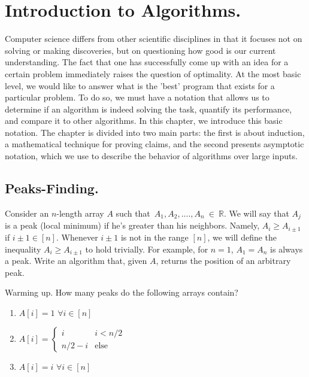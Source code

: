 
\newcommand*{\RECITATION}{}%
\newcommand*{\BOOK}{}%


\chapter{Introduction to Algorithms.}
\ifdefined\RECITATION
\else
Computer science differs from other scientific disciplines in that it focuses not on solving or making discoveries, but on questioning how good is our current understanding. The fact that one has successfully come up with an idea for a certain problem immediately raises the question of optimality. At the most basic level, we would like to answer what is the 'best'  program that exists for a particular problem. To do so, we must have a notation that allows us to determine if an algorithm is indeed solving the task, quantify its performance, and compare it to other algorithms. In this chapter, we introduce this basic notation. The chapter is divided into two main parts: the first is about induction, a mathematical technique for proving claims, and the second presents asymptotic notation, which we use to describe the behavior of algorithms over large inputs.
\fi
\section{Peaks-Finding.}
\begin{example}
Consider an \(n\)-length array $A$ such that~$A_1,A_2,....,A_n~\in~\mathbb{R}$. We will say that $A_{j}$ is a peak (local minimum) if he's greater than his neighbors. Namely, $A_{i} \ge A_{i\pm1}$ if $i\pm 1 \in [n]$. Whenever $i\pm 1$ is not in the range $[n]$, we will define the inequality $A_{i} \ge A_{i\pm 1}$ to hold trivially. For example, for $n=1$, $A_{1}=A_{n}$ is always a peak. Write an algorithm that, given $A$, returns the position of an arbitrary peak.
\end{example}


\begin{example}{Warming up.} \label{example:func} How many peaks do the following arrays contain?
  \begin{enumerate}
    \item $A[i] = 1$   $\forall i \in [n]$
    \item $A[i] = \begin{cases}
        i & i < n/2 \\
        n/2 - i & \text{else}
      \end{cases}$
    \item $A[i] = i $  $\forall i \in [n]$
  \end{enumerate}
\end{example}

